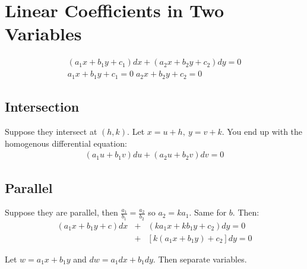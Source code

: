 \documentclass{article}
\begin{document}
\section{Linear Coefficients in Two Variables}
\begin{eqnarray}
(a_1 x + b_1 y + c_1)dx + (a_2 x + b_2 y + c_2)dy = 0 \\
a_1 x + b_1 y + c_1 = 0 \; a_2 x + b_2 y + c_2 = 0
\end{eqnarray}

\subsection{Intersection}
Suppose they intersect at $(h,k)$. Let $x=u+h,\: y=v+k$. You end up with the homogenous differential equation:
\begin{eqnarray}
(a_1 u + b_1 v)du + (a_2 u + b_2 v)dv = 0
\end{eqnarray}

\subsection{Parallel}
Suppose they are parallel, then $\frac{a_1}{b_1}=\frac{a_2}{b_2}$ so $a_2 = k a_1$. Same for $b$. Then:
\begin{eqnarray}
(a_1 x + b_1 y + c)dx &+& (k a_1 x + k b_1 y + c_2)dy = 0 \\
&+&[k(a_1 x + b_1 y) + c_2]dy = 0
\end{eqnarray}

Let $w=a_1 x + b_1 y$ and $dw = a_1 dx + b_1 dy$. Then separate variables.
\end{document}
